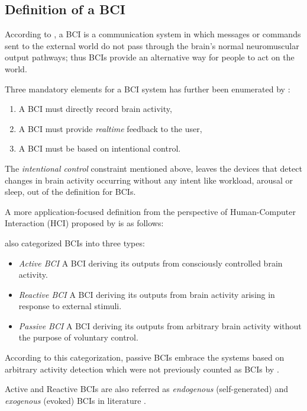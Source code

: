 \documentclass[12pt]{article}
\newcommand\mysubsection[1]{\subsection{#1}}
\numberwithin{equation}{section}
\numberwithin{figure}{section}
\numberwithin{table}{section}
\begin{document}
\mysubsection{Definition of a BCI}\label{seq:bci_definition}
\par{
    According to \citet{wolpaw_braincomputer_2002}, a BCI is a communication system
    in which messages or commands sent to the external world do not pass through the
    brain's normal neuromuscular output pathways; thus BCIs provide an alternative
    way for people to act on the world.
}
\par{
    Three mandatory elements for a BCI system has further been enumerated by \citet{graimann_braincomputer_2010}:
    \begin{enumerate}
        \item A BCI must directly record brain activity,
        \item A BCI must provide \emph{realtime} feedback to the user,
        \item A BCI must be based on intentional control.
    \end{enumerate}
    The \emph{intentional control} constraint mentioned above, leaves the devices
    that detect changes in brain activity occurring without any intent like
    workload, arousal or sleep, out of the definition for BCIs.
}
\par{
    A more application-focused definition from the perspective of
    Human-Computer Interaction (HCI) proposed by \citet{zander_enhancing_2010}
    is as follows:
}
\par{
    \citet{zander_enhancing_2008} also categorized BCIs into three types:
    \begin{itemize}
        \item \emph{Active BCI} A BCI deriving its outputs from consciously controlled brain activity.
        \item \emph{Reactive BCI} A BCI deriving its outputs from brain activity arising in response to external stimuli.
        \item \emph{Passive BCI} A BCI deriving its outputs from arbitrary brain activity without the purpose of voluntary control.
    \end{itemize}
    According to this categorization, passive BCIs embrace the systems
    based on arbitrary activity detection which were not previously counted as BCIs by \citet{graimann_braincomputer_2010}.
}
\par{
    Active and Reactive BCIs are also referred as \emph{endogenous} (self-generated) and \emph{exogenous} (evoked)
    BCIs in literature \citep{jackson_neural_2010}.
}
\end{document}
